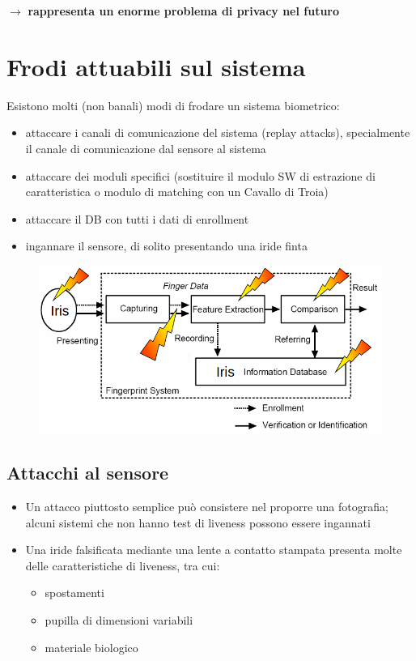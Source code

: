 \documentclass{report}
\begin{document}
\noindent $\rightarrow$ \textbf{rappresenta un enorme problema di privacy nel futuro}

\section{Frodi attuabili sul sistema}
Esistono molti (non banali) modi di frodare un sistema biometrico:
\begin{itemize}
    \item attaccare i canali di comunicazione del sistema (replay attacks), specialmente 
    il canale di comunicazione dal sensore al sistema 
    \item attaccare dei moduli specifici (sostituire il modulo SW di estrazione di caratteristica o modulo di matching con un Cavallo di Troia)
    \item attaccare il DB con tutti i dati di enrollment 
    \item ingannare il sensore, di solito presentando una iride finta
\end{itemize}

\begin{figure}[ht]
    \centering
    \includegraphics[width=0.8\linewidth]{images/frodi.png}
\end{figure}

\subsection{Attacchi al sensore}
\begin{itemize}
    \item Un attacco piuttosto semplice può consistere nel proporre una fotografia;
    alcuni sistemi che non hanno test di liveness possono essere ingannati
    \item Una iride falsificata mediante una lente a contatto stampata presenta molte 
    delle caratteristiche di liveness, tra cui:
    \begin{itemize}
        \item spostamenti
        \item pupilla di dimensioni variabili 
        \item materiale biologico 
    \end{itemize}
\end{itemize}
\end{document}
